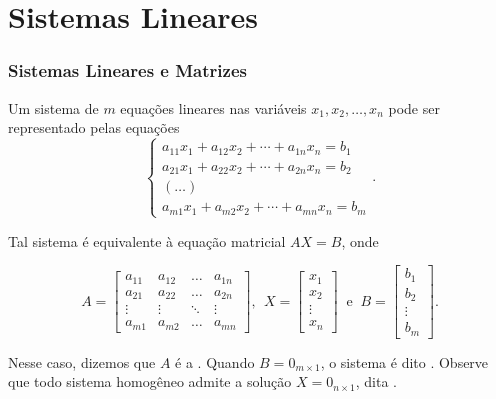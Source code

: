 \section{Sistemas Lineares}


\begin{frame}
    \frametitle{Sistemas Lineares e Matrizes}

    Um sistema de $m$ equações lineares nas variáveis $x_1, x_2, \dots, x_n$ pode ser representado pelas equações
    $$\left\{
        \begin{array}{llll}
        a_{11}x_1 + a_{12}x_2 + \cdots + a_{1n}x_n =b_1 \\
        a_{21}x_1 + a_{22}x_2 + \cdots + a_{2n}x_n =b_2 \\
        (\dots) \\
        a_{m1}x_1 + a_{m2}x_2 + \cdots + a_{mn}x_n =b_m  
        \end{array} \right. .$$
    
    Tal sistema é equivalente à equação matricial $AX = B$, onde

        \begin{displaymath} A = 
            \begin{bmatrix}
                a_{11} & a_{12} & \dots & a_{1n} \\
                a_{21} & a_{22} & \dots & a_{2n} \\
                \vdots & \vdots & \ddots & \vdots \\
                a_{m1} & a_{m2} & \dots & a_{mn}
            \end{bmatrix}
        ,    \ \ 
        X=
            \begin{bmatrix}
                x_1   \\
                x_2 \\
                \vdots \\
                x_n
            \end{bmatrix}
        \ \text{ e } \  B = 
            \begin{bmatrix}
                b_1   \\
                b_2 \\
                \vdots \\
                b_m 
            \end{bmatrix}.
        \end{displaymath}

    Nesse caso, dizemos que $A$ é a . Quando $B = 0_{m \times 1}$, o sistema é dito . Observe que todo sistema homogêneo admite a solução $X = 0_{n \times 1}$, dita .
\end{frame}

